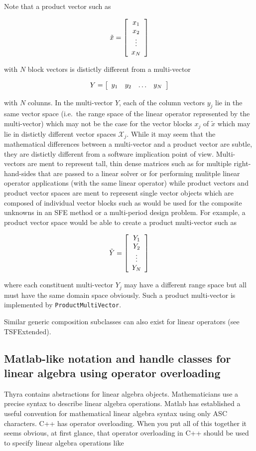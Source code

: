 \documentclass[pdf,ps2pdf,11pt]{SANDreport}
\begin{document}
Note that a product vector such as

\[
\tilde{x} = {\bmat{c} x_1 \\ x_2 \\ \vdots \\ x_N \emat}
\]

{}\noindent{}with $N$ block vectors is distictly different from a
multi-vector

\[
Y = {\bmat{cccc} y_1 & y_2 & \ldots & y_N \emat}
\]

{}\noindent{}with $N$ colunns.  In the multi-vector $Y$, each of the
column vectors $y_j$ lie in the same vector space (i.e.~the range
space of the linear operator represented by the multi-vector) which
may not be the case for the vector blocks $x_j$ of $\tilde{x}$ which
may lie in distictly different vector spaces $\mathcal{X}_j$.  While
it may seem that the mathematical differences between a multi-vector
and a product vector are subtle, they are distictly different from a
software implication point of view.  Multi-vectors are ment to
represent tall, thin dense matrices such as for multiple
right-hand-sides that are passed to a linear solver or for performing
mulitple linear operator applications (with the same linear operator)
while product vectors and product vector spaces are ment to represent
single vector objects which are composed of individual vector blocks
such as would be used for the composite unknowns in an SFE method or a
multi-period design problem.  For example, a product vector space
would be able to create a product multi-vector such as

\[
\tilde{Y} = {\bmat{c} Y_1 \\ Y_2 \\ \vdots \\ Y_N \emat}
\]

where each constituent multi-vector $Y_j$ may have a different range
space but all must have the same domain space obviously.  Such a
product multi-vector is implemented by
{}\texttt{Product\-Multi\-Vector}.

Similar generic composition subclasses can also exist for linear
operators (see TSFExtended).

%
\subsection{Matlab-like notation and handle classes for linear algebra
using operator overloading}
\label{tsfcore:sec:operator_overloading}
%

Thyra contains abstractions for linear algebra objects.
Mathematicians use a precise syntax to describe linear algebra
operations.  Matlab {}\cite{ref:matlab} has established a useful
convention for mathematical linear algebra syntax using only ASC
characters.  C++ has operator overloading.  When you put all of this
together it seems obvious, at first glance, that operator overloading
in C++ should be used to specify linear algebra operations like
\end{document}
